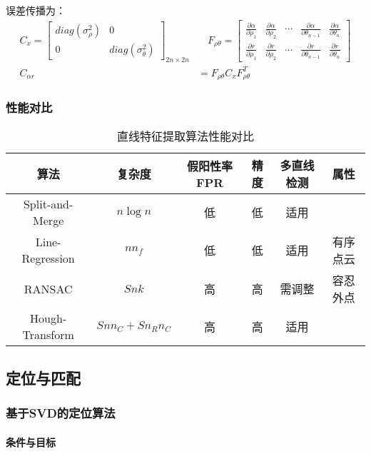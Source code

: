 \documentclass[
12pt, %
a4paper, 
oneside, %
headinclude,footinclude, %
]{scrartcl}
\begin{document}
误差传播为：
\begin{align*}
C_x = \begin{bmatrix} diag(\sigma_\rho^2) & 0 \\ 0 & diag(\sigma_\theta^2) \end{bmatrix}_{2n \times 2n} &\quad
F_{\rho\theta} = \begin{bmatrix} \frac{\partial \alpha}{\partial \rho_1} & \frac{\partial \alpha}{\partial \rho_2} & \cdots & \frac{\partial \alpha}{\partial \theta_{n - 1}} & \frac{\partial \alpha}{\partial \theta_n} \\ \frac{\partial r}{\partial \rho_1} & \frac{\partial r}{\partial \rho_2} & \cdots & \frac{\partial r}{\partial \theta_{n - 1}} & \frac{\partial r}{\partial \theta_n} \end{bmatrix} \\
C_{\alpha r} &= F_{\rho\theta} C_x F_{\rho\theta}^T    
\end{align*}
\subsubsection[性能对比]{性能对比}
\begin{table}[H]
\centering
\begin{tabular}{c|ccccc}
\hline
算法 & 复杂度 & 假阳性率FPR & 精度 & 多直线检测 & 属性 \\
\hline
Split-and-Merge & $ n \log n $ & 低 & 低 & 适用 &  \\
Line-Regression & $ n n_f $ & 低 & 低 & 适用 & 有序点云 \\
RANSAC & $ S n k $ & 高 & 高 & 需调整 & 容忍外点 \\
Hough-Transform & $ S n n_C + S n_R n_C $ & 高 & 高 & 适用 &  \\
\hline
\end{tabular}
\caption{直线特征提取算法性能对比}
\end{table}
\subsection[定位与匹配]{定位与匹配}
\subsubsection[基于SVD的定位算法]{基于SVD的定位算法}
\paragraph{条件与目标}~\\
\end{document}
